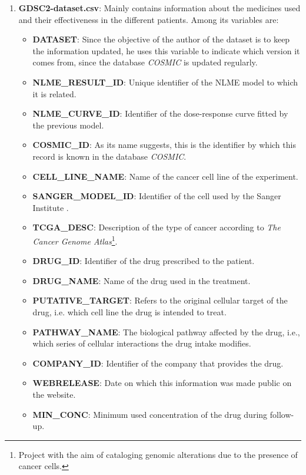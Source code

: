 \begin{enumerate}
    \item \textbf{GDSC2-dataset.csv}: Mainly contains information about the medicines used and their effectiveness in the different patients. Among its variables are:
    \begin{itemize}
        \item \textbf{DATASET}: Since the objective of the author of the dataset is to keep the information updated, he uses this variable to indicate which version it comes from, since the database \textit{COSMIC} is updated regularly.
        \item \textbf{NLME\_RESULT\_ID}: Unique identifier of the NLME model to which it is related.
        \item \textbf{NLME\_CURVE\_ID}: Identifier of the dose-response curve fitted by the previous model.
        \item \textbf{COSMIC\_ID}: As its name suggests, this is the identifier by which this record is known in the database \textit{COSMIC}.
        \item \textbf{CELL\_LINE\_NAME}: Name of the cancer cell line of the experiment.
        \item \textbf{SANGER\_MODEL\_ID}: Identifier of the cell used by the Sanger Institute \cite{sanger}.
        \item \textbf{TCGA\_DESC}: Description of the type of cancer according to \textit{The Cancer Genome Atlas}\footnote{Project with the aim of cataloging genomic alterations due to the presence of cancer cells.}.
        \item \textbf{DRUG\_ID}: Identifier of the drug prescribed to the patient.
        \item \textbf{DRUG\_NAME}: Name of the drug used in the treatment.
        \item \textbf{PUTATIVE\_TARGET}: Refers to the original cellular target of the drug, i.e. which cell line the drug is intended to treat.
        \item \textbf{PATHWAY\_NAME}: The biological pathway affected by the drug, i.e., which series of cellular interactions the drug intake modifies.
        \item \textbf{COMPANY\_ID}: Identifier of the company that provides the drug.
        \item \textbf{WEBRELEASE}: Date on which this information was made public on the website.
        \item \textbf{MIN\_CONC}: Minimum used concentration of the drug during follow-up.

\end{itemize}
\end{enumerate}
